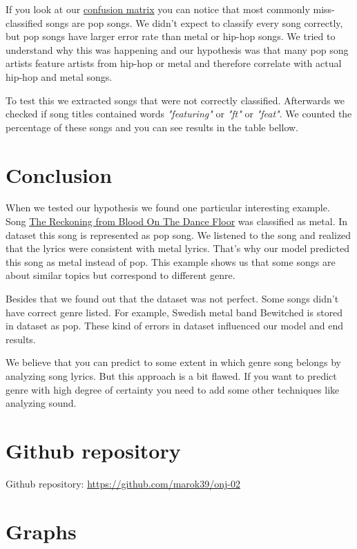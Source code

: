 \documentclass[a4paper,11pt]{article}
\begin{document}
If you look at our \hyperref[label-cf-matrix]{confusion matrix} you can notice that most commonly miss-classified songs are pop songs. We didn't expect to classify every song correctly, but pop songs have larger error rate than metal or hip-hop songs. We tried to understand why this was happening and our hypothesis was that many pop song artists feature artists from hip-hop or metal and therefore correlate with actual hip-hop and metal songs.

To test this we extracted songs that were not correctly classified. Afterwards we checked if song titles contained words \textit{"featuring"} or \textit{"ft"} or \textit{"feat"}. We counted the percentage of these songs and you can see results in the table bellow.


\section{Conclusion}

When we tested our hypothesis we found one particular interesting example. Song \href{https://www.youtube.com/watch?v=iKFYrPH5nRI}{The Reckoning from Blood On The Dance Floor} was classified as metal. In dataset this song is represented as pop song. We listened to the song and realized that the lyrics were consistent with metal lyrics. That's why our model predicted this song as metal instead of pop. This example shows us that some songs are about similar topics but correspond to different genre.

Besides that we found out that the dataset was not perfect. Some songs didn't have correct genre listed. For example, Swedish metal band Bewitched is stored in dataset as pop. These kind of errors in dataset influenced our model and end results.

We believe that you can predict to some extent in which genre song belongs by analyzing song lyrics. But this approach is a bit flawed. If you want to predict genre with high degree of certainty you need to add some other techniques like analyzing sound.


\section{Github repository}
Github repository: \href{https://github.com/marok39/onj-02}{https://github.com/marok39/onj-02}

\pagebreak
\appendix
\appendixpage
\section{\label{label-graphs} Graphs}
\end{document}
